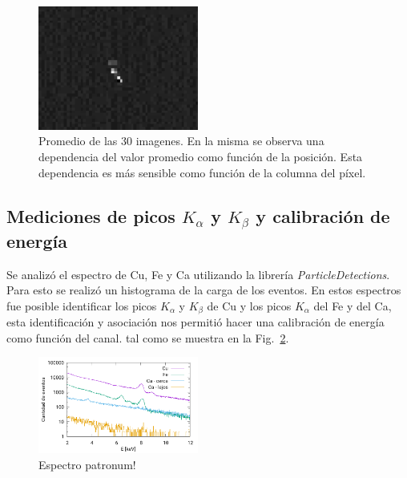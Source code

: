 \documentclass[twoside,twocolumn]{article}
\begin{document}
      \begin{figure}[h]
        \includegraphics[width=0.47\textwidth]{figures/06-04-18_09-27-42.eps} %
        \caption{Promedio de las 30 imagenes.
          En la misma se observa una dependencia del valor promedio como función de la posición.
          Esta dependencia es más sensible como función de la columna del píxel. }
        \label{fig:background}
      \end{figure}

    \subsection{Mediciones de picos $K_{\alpha}$ y $K_{\beta}$ y calibración de energía}\label{sec:results:peaks}
      Se analizó el espectro de Cu, Fe y Ca utilizando la librería \emph{ParticleDetections}.
      Para esto se realizó un histograma de la carga de los eventos.
      En estos espectros fue posible identificar los picos $K_{\alpha}$ y $K_{\beta}$ de Cu y los picos $K_{\alpha}$ del Fe y del Ca,
      esta identificación y asociación nos permitió hacer una calibración de energía como función del canal.
      tal como se muestra en la Fig.~\ref{fig:spectrum_x-ray}.
      
    \begin{figure}[h]
      \includegraphics[width=0.47\textwidth]{figures/x-ray_spectrum.pdf}
      \caption{Espectro patronum!}
      \label{fig:spectrum_x-ray}
    \end{figure}
\end{document}
